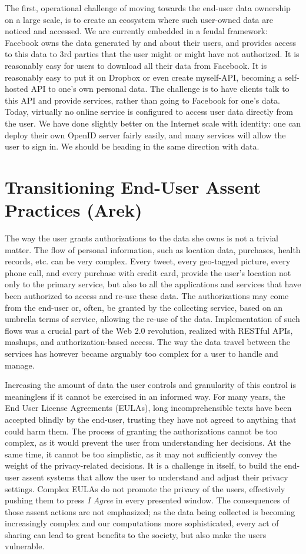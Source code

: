 The first, operational challenge of moving towards the end-user data ownership on a large scale, is to create an ecosystem where such user-owned data are noticed and accessed.
We are currently embedded in a feudal framework: Facebook owns the data generated by and about their users, and provides access to this data to 3rd parties that the user might or might have not authorized.
It is reasonably easy for users to download all their data from Facebook.
It is reasonably easy to put it on Dropbox or even create myself-API, becoming a self-hosted API to one's own personal data.
The challenge is to have clients talk to this API and provide services, rather than going to Facebook for one's data.
Today, virtually no online service is configured to access user data directly from the user.
We have done slightly better on the Internet scale with identity: one can deploy their own OpenID server fairly easily, and many services will allow the user to sign in.
We should be heading in the same direction with data.

\section{Transitioning End-User Assent Practices (Arek)}

The way the user grants authorizations to the data she owns is not a trivial matter.
The flow of personal information, such as location data, purchases, health records, etc. can be very complex.
Every tweet, every geo-tagged picture, every phone call, and every purchase with credit card, provide the user's location not only to the primary service, but also to all the applications and services that have been authorized to access and re-use these data.
The authorizations may come from the end-user or, often, be granted by the collecting service, based on an umbrella terms of service, allowing the re-use of the data.
Implementation of such flows was a crucial part of the Web 2.0 revolution, realized with RESTful APIs, mashups, and authorization-based access.
The way the data travel between the services has however became arguably too complex for a user to handle and manage.

Increasing the amount of data the user controls and granularity of this control is meaningless if it cannot be exercised in an informed way.
For many years, the End User License Agreements (EULAs), long incomprehensible texts have been accepted blindly by the end-user, trusting they have not agreed to anything that could harm them.
The process of granting the authorizations cannot be too complex, as it would prevent the user from understanding her decisions.
At the same time, it cannot be too simplistic, as it may not sufficiently convey the weight of the privacy-related decisions.
It is a challenge in itself, to build the end-user assent systems that allow the user to understand and adjust their privacy settings.
Complex EULAs do not promote the privacy of the users, effectively pushing them to press \emph{I Agree} in every presented window.
The consequences of those assent actions are not emphasized; as the data being collected is becoming increasingly complex and our computations more sophisticated, every act of sharing can lead to great benefits to the society, but also make the users vulnerable.

